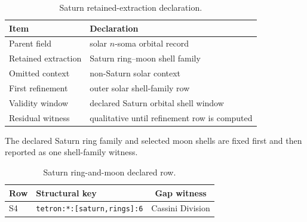 \begin{table}[H]
\centering
\caption{Saturn retained-extraction declaration.}
\label{tab:saturn-retention}
\begin{threeparttable}
\begin{tabularx}{\linewidth}{@{}lX@{}}
\toprule
Item & Declaration \\
\midrule
Parent field & solar \(n\)-soma orbital record \\
Retained extraction & Saturn ring--moon shell family \\
Omitted context & non-Saturn solar context \\
First refinement & outer solar shell-family row \\
Validity window & declared Saturn orbital shell window \\
Residual witness & qualitative until refinement row is computed \\
\bottomrule
\end{tabularx}
\end{threeparttable}
\end{table}

The declared Saturn ring family and selected moon shells are fixed first and then reported as one shell-family witness.

\begin{table}[H]
\centering
\caption{Saturn ring-and-moon declared row.}
\label{tab:saturn-shell-row}
\begin{threeparttable}
\small
\begin{tabularx}{\linewidth}{@{}lXc@{}}
\toprule
Row & Structural key & Gap witness \\
\midrule
S4 & \texttt{tetron:*:[saturn,rings]:6} & Cassini Division \\
\bottomrule
\end{tabularx}
\end{threeparttable}
\end{table}

